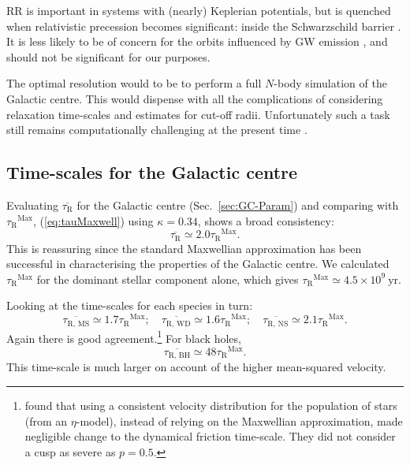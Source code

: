 \documentclass[useAMS,usedcolumn,usegraphicx,usenatbib]{mn2e}
\newcommand{\eqnref}[1]{(\ref{eq:#1})}
\newcommand{\secref}[1]{Sec.~\ref{sec:#1}}
\newcommand{\units}[1]{\ensuremath{~\mathrm{#1}}}
\newcommand{\sub}[1]{\ensuremath{_\mathrm{#1}}}
\newcommand{\super}[1]{\ensuremath{^\mathrm{#1}}}
\begin{document}
\begin{onecolumn}
RR is important in systems with (nearly) Keplerian potentials, but is quenched when relativistic precession becomes significant: inside the Schwarzschild barrier \citep{Merritt2011}. It is less likely to be of concern for the orbits influenced by GW emission \citep{Sigurdsson1997}, and should not be significant for our purposes.

The optimal resolution would to be to perform a full $N$-body simulation of the Galactic centre. This would dispense with all the complications of considering relaxation time-scales and estimates for cut-off radii. Unfortunately such a task still remains computationally challenging at the present time \citep[e.g.][]{Li2012}.

\subsection{Time-scales for the Galactic centre}\label{sec:tauGC}

Evaluating $\overline{\tau\sub{R}}$ for the Galactic centre (\secref{GC-Param}) and comparing with $\tau\sub{R}\super{Max}$, \eqnref{tauMaxwell} using $\kappa = 0.34$, shows a broad consistency:
\begin{equation}
\overline{\tau\sub{R}} \simeq 2.0 \tau\sub{R}\super{Max}.
\end{equation}
This is reassuring since the standard Maxwellian approximation has been successful in characterising the properties of the Galactic centre. We calculated $\tau\sub{R}\super{Max}$ for the dominant stellar component alone, which gives $\tau\sub{R}\super{Max}\simeq 4.5 \times 10^9\units{yr}$.

Looking at the time-scales for each species in turn:
\begin{equation}
\overline{\tau\sub{R,\,MS}} \simeq 1.7 \tau\sub{R}\super{Max};\quad \overline{\tau\sub{R,\,WD}} \simeq 1.6 \tau\sub{R}\super{Max};\quad \overline{\tau\sub{R,\,NS}} \simeq 2.1 \tau\sub{R}\super{Max}.
\end{equation}
Again there is good agreement.\footnote{\citet*{Freitag2006} found that using a consistent velocity distribution for the population of stars (from an $\eta$-model), instead of relying on the Maxwellian approximation, made negligible change to the dynamical friction time-scale. They did not consider a cusp as severe as $p = 0.5$.} For black holes,
\begin{equation}
\overline{\tau\sub{R,\,BH}} \simeq 48 \tau\sub{R}\super{Max}.
\end{equation}
This time-scale is much larger on account of the higher mean-squared velocity.


\end{onecolumn}
\end{document}
